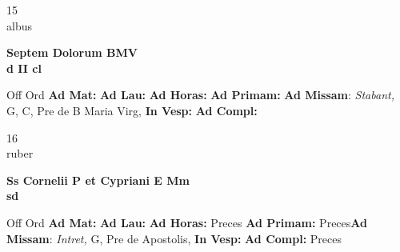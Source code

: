 \documentclass[10pt, openany]{book}
\begin{document}
    \begin{center}
        \begin{minipage}{3.5in}
            \vspace{2em}
            \begin{minipage}{0.5in}
                {\Huge 15} \\
                {\normalsize albus}
            \end{minipage}
            \begin{minipage}{3.0in}
                \textbf{ \large Septem Dolorum BMV \\
                \textnormal{\normalsize d II cl}}

            \end{minipage}
            \begin{justify}Off Ord
                \textbf{Ad Mat: }
                \textbf{Ad Lau: }
                \textbf{Ad Horas: }
                \textbf{Ad Primam: }\textbf{Ad Missam}: \textit{Stabant,} G, C, Pre de B Maria Virg, 
                \textbf{In Vesp: }
                \textbf{Ad Compl: }
            \end{justify}
        \end{minipage}
    \end{center}

    \begin{center}
        \begin{minipage}{3.5in}
            \vspace{2em}
            \begin{minipage}{0.5in}
                {\Huge 16} \\
                {\normalsize ruber}
            \end{minipage}
            \begin{minipage}{3.0in}
                \textbf{ \large Ss Cornelii P et Cypriani E Mm \\
                \textnormal{\normalsize sd}}

            \end{minipage}
            \begin{justify}Off Ord
                \textbf{Ad Mat: }
                \textbf{Ad Lau: }
                \textbf{Ad Horas: }Preces
                \textbf{Ad Primam: }Preces\textbf{Ad Missam}: \textit{Intret,} G, Pre de Apostolis, 
                \textbf{In Vesp: }
                \textbf{Ad Compl: }Preces
            \end{justify}
        \end{minipage}
    \end{center}
\end{document}
